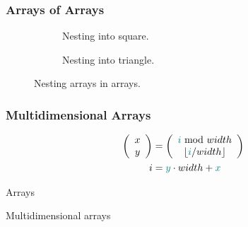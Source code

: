 \subsubsection{Arrays of Arrays}


\begin{figure}[tbp]
  \begin{subfigure}[b]{0.45\textwidth}
    
    \caption{Nesting into square.}
    \label{fig:data:array:nest:square}
  \end{subfigure}
  \hfill
  \begin{subfigure}[b]{0.45\textwidth}
    
    \caption{Nesting into triangle.}
    \label{fig:data:array:nest:triangle}
  \end{subfigure}
  \caption{Nesting arrays in arrays.}
  \label{fig:data:array:nest}
\end{figure}

\subsubsection{Multidimensional Arrays}

\begin{alignat}{1}
  \left(
    \begin{array}{c}
      x \\
      y
    \end{array}
  \right)
  &= 
  \left(
    \begin{array}{c}
      \textcolor{teal}{i} ~\mathrm{mod}~ width \\
      \lfloor \textcolor{teal}{i} / width \rfloor
    \end{array}
  \right)
  \\
  i &= \textcolor{teal}{y} \cdot width + \textcolor{teal}{x}
\end{alignat}

\csharpsubsubsection{\csharp}

\begin{syntaxfloat}
  
  \caption{Arrays}
  \label{syntax:data:array}
\end{syntaxfloat}




\begin{syntaxfloat}
  
  \caption{Multidimensional arrays}
  \label{syntax:data:marray}
\end{syntaxfloat}

